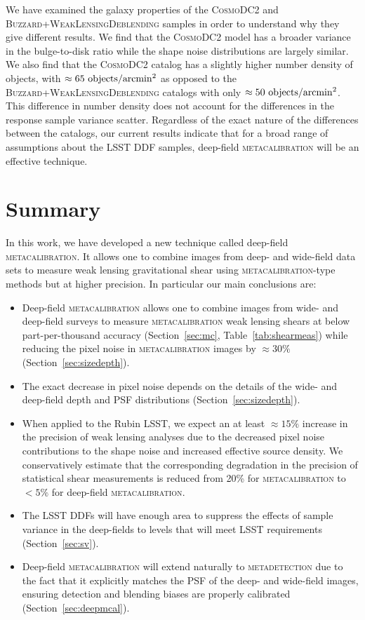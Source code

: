\documentclass[twocolumn]{openjournal}
\makeatletter
\newcommand{\mdet}{\textsc{metadetection}\@\xspace}
\newcommand{\mcal}{\textsc{metacalibration}\@\xspace}
\newcommand{\descwl}{\textsc{WeakLensingDeblending}\@\xspace}
\newcommand{\cosmodctwo}{\textsc{CosmoDC2}\@\xspace}
\newcommand{\buzzard}{\textsc{Buzzard}\@\xspace}
\makeatother
\begin{document}
We have examined the galaxy properties of the \cosmodctwo and \buzzard+\descwl samples
in order to understand why they give different results. We find that the \cosmodctwo
model has a broader variance in the bulge-to-disk ratio while the shape noise
distributions are largely similar. We also find that the \cosmodctwo catalog has a
slightly higher number density of objects, with $\approx65\ {\rm objects}/{\rm
arcmin}^2$ as opposed to the \buzzard+\descwl catalogs with only $\approx50\ {\rm
objects}/{\rm arcmin}^2$. This difference in number density does not account for the
differences in the response sample variance scatter. Regardless of the exact nature of
the differences between the catalogs, our current results indicate that for a broad
range of assumptions about the LSST DDF samples, deep-field \mcal will be an effective
technique.


\section{Summary}\label{sec:conc}

In this work, we have developed a new technique called deep-field \mcal. It allows one
to combine images from deep- and wide-field data sets to measure weak lensing
gravitational shear using \mcal-type methods but at higher precision. In particular our main
conclusions are:
\begin{itemize}
  \item Deep-field \mcal allows one to combine images from wide- and deep-field surveys
    to measure \mcal weak lensing shears at below part-per-thousand accuracy
    (Section~\ref{sec:mc}, Table~\ref{tab:shearmeas}) while reducing the pixel noise
    in \mcal images by $\approx30\%$ (Section~\ref{sec:sizedepth}).
  \item The exact decrease in pixel noise depends on the details of
    the wide- and deep-field depth and PSF distributions (Section~\ref{sec:sizedepth}).
  \item When applied to the Rubin LSST, we expect an at least $\approx15\%$ increase in
    the precision of weak lensing analyses due to the decreased pixel noise contributions
    to the shape noise and increased effective source density.  We conservatively
    estimate that the corresponding degradation in the precision of statistical
    shear measurements is reduced from 20\% for \mcal to $<5\%$ for deep-field \mcal.
  \item The LSST DDFs will have enough area to suppress the effects of sample variance
    in the deep-fields to levels that will meet LSST requirements
    (Section~\ref{sec:sv}).
  \item Deep-field \mcal will extend naturally to \mdet due to the fact that it
    explicitly matches the PSF of the deep- and wide-field images, ensuring detection
    and blending biases are properly calibrated (Section~\ref{sec:deepmcal}).
\end{itemize}
\end{document}

